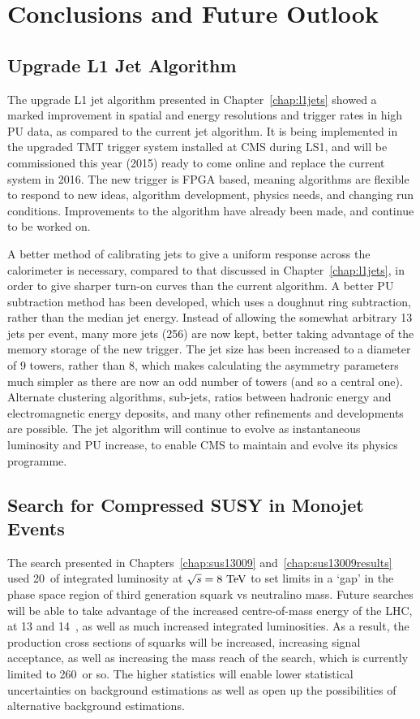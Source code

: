 \chapter{Conclusions and Future Outlook \label{chap_concl}}

\section{Upgrade L1 Jet Algorithm}

The upgrade \ac{L1} jet algorithm presented in Chapter~\ref{chap:l1jets} showed a marked improvement in spatial and energy resolutions
and trigger rates in high \ac{PU} data, as compared to the current jet algorithm. 
It is being implemented in the upgraded \ac{TMT} trigger system installed at \ac{CMS} during LS1, and will be commissioned this year (2015) ready to come online and replace the current system in 2016. 
The new trigger is \ac{FPGA} based, meaning algorithms are flexible to respond to new ideas, algorithm development, physics needs, and changing run conditions. 
Improvements to the algorithm have already been made, and continue to be worked on.

A better method of calibrating jets to give a uniform response across the calorimeter is necessary, compared to that discussed in Chapter~\ref{chap:l1jets}, in order to give sharper turn-on curves than the current algorithm.
A better \ac{PU} subtraction method has been developed, which uses a doughnut ring subtraction, rather than the median jet energy. 
Instead of allowing the somewhat arbitrary 13 jets per event, many more jets (256) are now kept, better taking advantage of the memory storage of the new trigger. The jet size has been increased to a diameter of 9 towers, rather than 8, which makes calculating the asymmetry parameters much simpler as there are now an odd number of towers (and so a central one).
Alternate clustering algorithms, sub-jets, ratios between hadronic energy and electromagnetic energy deposits, and many other refinements and developments are possible. 
The jet algorithm will continue to evolve as instantaneous luminosity and \ac{PU} increase, to enable \ac{CMS} to maintain and evolve its physics programme.


\section{Search for Compressed SUSY in Monojet Events}

The search presented in Chapters~\ref{chap:sus13009} and~\ref{chap:sus13009results} used 20~\fbinv of integrated luminosity at $\sqrt{s}=8~\mathrm{TeV}$ to set limits in a `gap' in the phase space region of third generation squark vs neutralino mass. 
Future searches will be able to take advantage of the increased centre-of-mass energy of the \ac{LHC}, at 13 and 14~\TeV{}, as well as much increased integrated luminosities. 
As a result, the production cross sections of squarks will be increased, increasing signal acceptance, as well as increasing the mass reach of the search, which is currently limited to 260~\GeV or so. 
The higher statistics will enable lower statistical uncertainties on background estimations as well as open up the possibilities of alternative background estimations.

